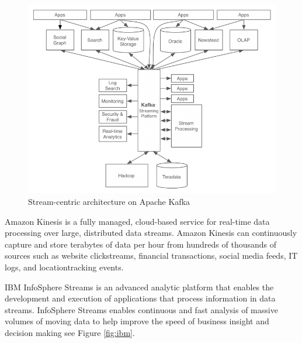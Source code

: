 \documentclass[twoside,12pt, a4paper]{report}
\begin{document}
\begin{figure}[!h]
	\centering
	\includegraphics[width=1\linewidth]{figures/data-flow-768x584.png}
	\caption{Stream-centric architecture on Apache Kafka \cite{Kafka} }
	\label{fig:kafka}
\end{figure}

Amazon Kinesis \cite{kinesis} is a fully managed, cloud-based
service for real-time data processing over large, distributed
data streams. Amazon Kinesis can continuously capture and
store terabytes of data per hour from hundreds of thousands
of sources such as website clickstreams, financial
transactions, social media feeds, IT logs, and locationtracking
events.



IBM InfoSphere Streams \cite{ballard2014ibm,ibmdoc} is an advanced analytic
platform that enables the development and execution
of applications that process information in data streams.
InfoSphere Streams enables continuous and fast analysis of massive volumes
of moving data to help improve the speed of business insight and decision making see Figure \ref{fig:ibm}.
\end{document}

